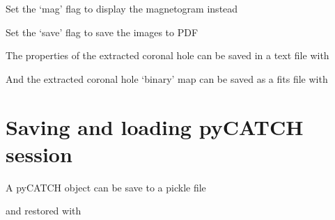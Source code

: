 \documentclass[letterpaper,10pt,english]{sphinxmanual}
\begin{document}
\sphinxAtStartPar
Set the ‘mag’ flag to display the magnetogram instead

\begin{sphinxVerbatim}[commandchars=\\\{\}]
\end{sphinxVerbatim}

\sphinxAtStartPar
Set the ‘save’ flag to save the images to PDF

\begin{sphinxVerbatim}[commandchars=\\\{\}]
\end{sphinxVerbatim}

\sphinxAtStartPar
The properties of the extracted coronal hole can be saved in a text file with

\begin{sphinxVerbatim}[commandchars=\\\{\}]
\end{sphinxVerbatim}

\sphinxAtStartPar
And the extracted coronal hole ‘binary’ map can be saved as a fits file with

\begin{sphinxVerbatim}[commandchars=\\\{\}]
\end{sphinxVerbatim}


\section{Saving and loading pyCATCH session}
\label{\detokenize{getting_started:saving-and-loading-pycatch-session}}
\sphinxAtStartPar
A pyCATCH object can be save to a pickle file

\begin{sphinxVerbatim}[commandchars=\\\{\}]
\end{sphinxVerbatim}

\sphinxAtStartPar
and restored with
\end{document}
